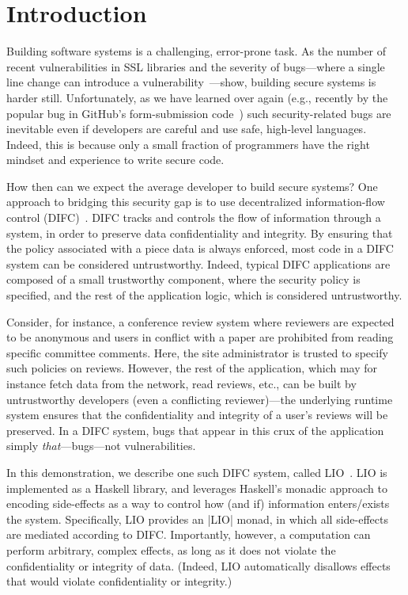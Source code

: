 \section{Introduction}
\label{sec:intro}

Building software systems is a challenging, error-prone task.
%
As the number of recent vulnerabilities in SSL libraries and the
severity of bugs---where a single line change can introduce a
vulnerability~\cite{goto}---show, building secure systems is harder
still.
%
Unfortunately, as we have learned over again (e.g., recently by the
popular bug in GitHub's form-submission code~\cite{gitfail}) such
security-related bugs are inevitable even if developers are careful
and use safe, high-level languages.
%
Indeed, this is because only a small fraction of programmers have the
right mindset and experience to write secure code.
%


How then can we expect the average developer to build secure systems?
%
One approach to bridging this security gap is to use decentralized
information-flow control (DIFC)~\cite{myers:dlm,
sabelfeld:language-based-iflow}.
%
DIFC tracks and controls the flow of information through a system, in
order to preserve data confidentiality and integrity.
%
By ensuring that the policy associated with a piece data is always
enforced, most code in a DIFC system can be considered untrustworthy.
%
Indeed, typical DIFC applications are composed of a small trustworthy
component, where the security policy is specified, and the rest of the
application logic, which is considered untrustworthy.
%

%
Consider, for instance, a conference review system where reviewers are
expected to be anonymous and users in conflict with a paper are
prohibited from reading specific committee comments.
%
Here, the site administrator is trusted to specify such policies on
reviews. 
%
However, the rest of the application, which may for instance fetch
data from the network, read reviews, etc., can be built by
untrustworthy developers (even a conflicting reviewer)---the
underlying runtime system ensures that the confidentiality and
integrity of a user's reviews will be preserved.
%
In a DIFC system, bugs that appear in this crux of the application
simply \emph{that}---bugs---not vulnerabilities.

In this demonstration, we describe one such DIFC system, called
LIO~\cite{lio, concurrent-lio}.
%
LIO is implemented as a Haskell library, and leverages Haskell's
monadic approach to encoding side-effects as a way to control how (and
if) information enters/exists the system.
%
Specifically, LIO provides an \hs|LIO| monad, in which
all side-effects are mediated according to DIFC.
%
Importantly, however, a computation can perform arbitrary, complex
effects, as long as it does not violate the confidentiality or
integrity of data.
%
(Indeed, LIO automatically disallows effects that would violate
confidentiality or integrity.)
